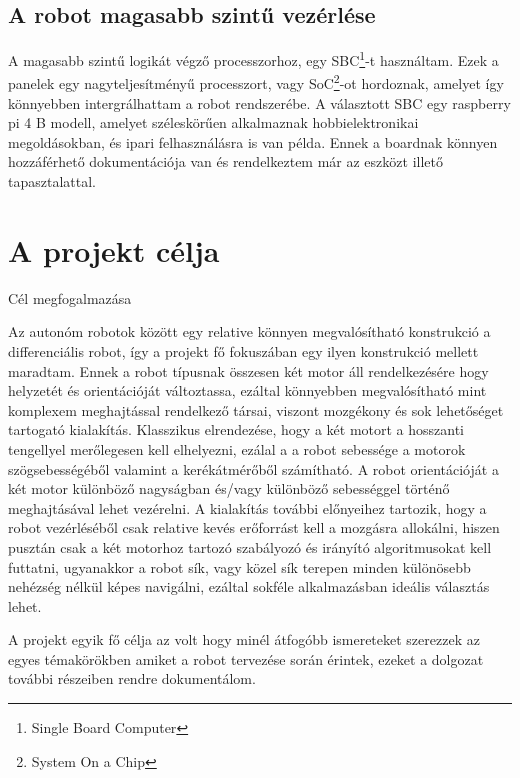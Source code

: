 \subsection{A robot magasabb szintű vezérlése}

A magasabb szintű logikát végző processzorhoz, egy SBC\footnote{Single Board
Computer}-t használtam. Ezek a panelek egy nagyteljesítményű processzort, vagy
SoC\footnote{System On a Chip}-ot hordoznak, amelyet így könnyebben
intergrálhattam a robot rendszerébe. A választott SBC egy raspberry pi 4 B
modell, amelyet széleskörűen alkalmaznak hobbielektronikai megoldásokban, és
ipari felhasználásra is van példa. Ennek a boardnak könnyen hozzáférhető
dokumentációja van és rendelkeztem már az eszközt illető tapasztalattal.

\section{A projekt célja}

Cél megfogalmazása








\medskip
Az autonóm robotok között egy relative könnyen megvalósítható konstrukció a
differenciális robot, így a projekt fő fokuszában egy ilyen konstrukció  mellett
maradtam. Ennek a robot típusnak összesen két motor áll rendelkezésére hogy
helyzetét és orientációját változtassa, ezáltal  könnyebben megvalósítható mint
komplexem meghajtással rendelkező társai, viszont mozgékony és sok lehetőséget
tartogató kialakítás. Klasszikus elrendezése, hogy a két motort a hosszanti
tengellyel merőlegesen kell elhelyezni, ezálal a  a robot sebessége a motorok
szögsebességéből valamint a kerékátmérőből számítható. A robot orientációját a
két motor különböző nagyságban és/vagy különböző sebességgel történő
meghajtásával lehet vezérelni. A kialakítás további előnyeihez tartozik, hogy a
robot vezérléséből csak relative kevés erőforrást kell a mozgásra allokálni,
hiszen pusztán csak a két motorhoz tartozó szabályozó és irányító algoritmusokat
kell futtatni, ugyanakkor a robot sík, vagy közel sík terepen minden különösebb
nehézség nélkül képes navigálni, ezáltal sokféle alkalmazásban ideális választás
lehet.

A projekt egyik fő célja az volt hogy minél átfogóbb ismereteket szerezzek az
egyes témakörökben amiket a robot tervezése során érintek, ezeket a dolgozat
további részeiben rendre dokumentálom.

